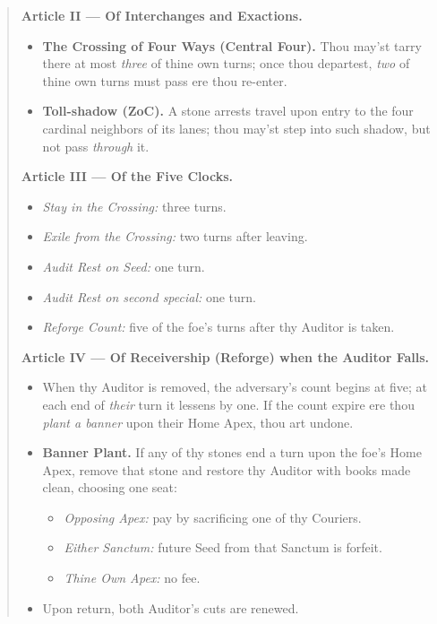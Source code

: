 \documentclass[11pt]{article}
\begin{document}
\begin{quote}
\textbf{Article II — Of Interchanges and Exactions.}
\begin{itemize}\itemsep0.25em
  \item \textbf{The Crossing of Four Ways (Central Four).} Thou may’st tarry there at most \emph{three} of thine own turns; once thou departest, \emph{two} of thine own turns must pass ere thou re-enter.
  \item \textbf{Toll-shadow (ZoC).} A stone arrests travel upon entry to the four cardinal neighbors of its lanes; thou may’st step into such shadow, but not pass \emph{through} it.
\end{itemize}

\textbf{Article III — Of the Five Clocks.}
\begin{itemize}\itemsep0.25em
  \item \emph{Stay in the Crossing:} three turns.
  \item \emph{Exile from the Crossing:} two turns after leaving.
  \item \emph{Audit Rest on Seed:} one turn.
  \item \emph{Audit Rest on second special:} one turn.
  \item \emph{Reforge Count:} five of the foe’s turns after thy Auditor is taken.
\end{itemize}

\textbf{Article IV — Of Receivership (Reforge) when the Auditor Falls.}
\begin{itemize}\itemsep0.25em
  \item When thy Auditor is removed, the adversary’s count begins at five; at each end of \emph{their} turn it lessens by one. If the count expire ere thou \emph{plant a banner} upon their Home Apex, thou art undone.
  \item \textbf{Banner Plant.} If any of thy stones end a turn upon the foe’s Home Apex, remove that stone and restore thy Auditor with books made clean, choosing one seat:
    \begin{itemize}\itemsep0.15em
      \item \emph{Opposing Apex:} pay by sacrificing one of thy Couriers.
      \item \emph{Either Sanctum:} future Seed from that Sanctum is forfeit.
      \item \emph{Thine Own Apex:} no fee.
    \end{itemize}
  \item Upon return, both Auditor’s cuts are renewed.
\end{itemize}


\end{quote}
\end{document}
